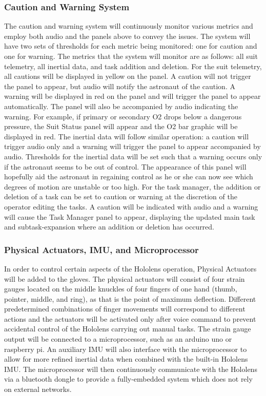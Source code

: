 \documentclass{article}
\let\Oldsubsubsection\subsubsection
\renewcommand{\subsubsection}{\FloatBarrier\Oldsubsubsection}
\begin{document}
\subsubsection{Caution and Warning System}

The caution and warning system will continuously monitor various metrics and employ both audio and the panels above to convey the issues. The system will have two sets of thresholds for each metric being monitored: one for caution and one for warning. The metrics that the system will monitor are as follows:  all suit telemetry, all inertial data, and task addition and deletion. For the suit telemetry, all cautions will be displayed in yellow on the panel. A caution will not trigger the panel to appear, but audio will notify the astronaut of the caution. A warning will be displayed in red on the panel and will trigger the panel to appear automatically. The panel will also be accompanied by audio indicating the warning. For example, if primary or secondary O2 drops below a dangerous pressure, the Suit Status panel will appear and the O2 bar graphic will be displayed in red. The inertial data will follow similar operation: a caution will trigger audio only and a warning will trigger the panel to appear accompanied by audio. Thresholds for the inertial data will be set such that a warning occurs only if the astronaut seems to be out of control. The appearance of this panel will hopefully aid the astronaut in regaining control as he or she can now see which degrees of motion are unstable or too high. For the task manager, the addition or deletion of a task can be set to caution or warning at the discretion of the operator editing the tasks. A caution will be indicated with audio and a warning will cause the Task Manager panel to appear, displaying the updated main task and subtask-expansion where an addition or deletion has occurred.

\subsubsection{Physical Actuators, IMU, and Microprocessor}

In order to control certain aspects of the Hololens operation, Physical Actuators will be added to the gloves. The physical actuators will consist of four strain gauges located on the middle knuckles of four fingers of one hand (thumb, pointer, middle, and ring), as that is the point of maximum deflection. Different predetermined combinations of finger movements will correspond to different actions and the actuators will be activated only after voice command to prevent accidental control of the Hololens carrying out manual tasks. The strain gauge output will be connected to a microprocessor, such as an arduino uno or raspberry pi. An auxiliary IMU will also interface with the microprocessor to allow for more refined inertial data when combined with the built-in Hololens IMU. The microprocessor will then continuously communicate with the Hololens via a bluetooth dongle to provide a fully-embedded system which does not rely on external networks.
\end{document}
